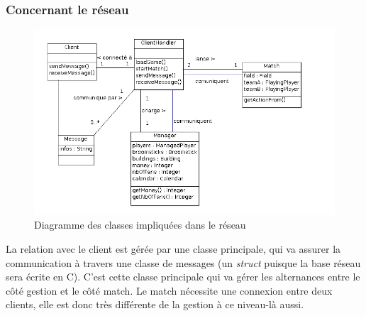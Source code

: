 \documentclass[a4paper,titlepage]{scrreprt}
\begin{document}
  \subsubsection{Concernant le réseau}
    \begin{figure}[H]
    \center
    \includegraphics[scale=0.5]{uml/class/Diagrammedeclasses.png}
    \caption{Diagramme des classes impliquées dans le réseau}
    \end{figure}	
    La relation avec le client est gérée par une classe principale, qui va assurer la communication
    à travers une classe de messages (un \emph{struct} puisque la base réseau sera écrite en C).
    C'est cette classe principale qui va gérer les alternances entre le côté gestion et le côté match. Le match nécessite une connexion entre deux clients, elle est donc très différente de la gestion
    à ce niveau-là aussi.
\end{document}

